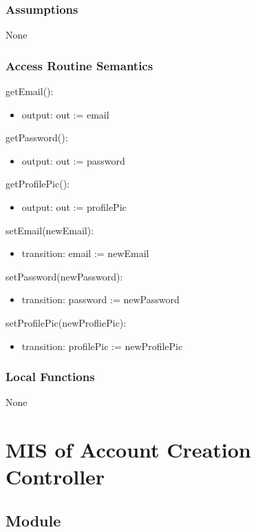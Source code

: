 \documentclass[12pt, titlepage]{article}
\begin{document}
\subsubsection{Assumptions}
None

\subsubsection{Access Routine Semantics}

\noindent getEmail():
\begin{itemize}
\item output: out := email
\end{itemize}

\noindent getPassword():
\begin{itemize}
\item output: out := password
\end{itemize}

\noindent getProfilePic():
\begin{itemize}
\item output: out := profilePic
\end{itemize}

\noindent setEmail(newEmail):
\begin{itemize}
\item transition: email := newEmail 
\end{itemize}

\noindent setPassword(newPassword):
\begin{itemize}
\item transition: password := newPassword
\end{itemize}

\noindent setProfilePic(newProfliePic):
\begin{itemize}
\item transition: profilePic := newProfilePic 
\end{itemize}

\subsubsection{Local Functions}
None

\section{MIS of Account Creation Controller} \label{acc}

\subsection{Module}
\end{document}
